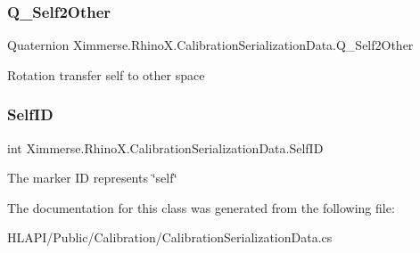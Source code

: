 \subsubsection{\texorpdfstring{Q\+\_\+\+Self2\+Other}{Q\_Self2Other}}
{\footnotesize\ttfamily Quaternion Ximmerse.\+Rhino\+X.\+Calibration\+Serialization\+Data.\+Q\+\_\+\+Self2\+Other}



Rotation transfer self to other space 

\mbox{\label{class_ximmerse_1_1_rhino_x_1_1_calibration_serialization_data_a40dcec53e2ae1967cf4ef5aedff63c92}} 
\subsubsection{\texorpdfstring{Self\+ID}{SelfID}}
{\footnotesize\ttfamily int Ximmerse.\+Rhino\+X.\+Calibration\+Serialization\+Data.\+Self\+ID}



The marker ID represents \char`\"{}self\char`\"{} 



The documentation for this class was generated from the following file\+:\begin{DoxyCompactItemize}
\item 
H\+L\+A\+P\+I/\+Public/\+Calibration/Calibration\+Serialization\+Data.\+cs\end{DoxyCompactItemize}
